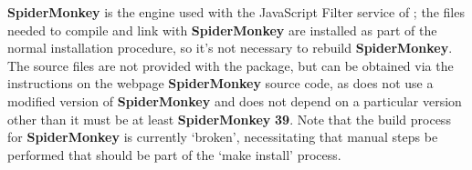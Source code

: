 \tertiaryEnd
\secondaryEnd
{}
\textbf{SpiderMonkey} is the  engine used with the JavaScript Filter
service of \mplusm{}; the files needed to compile and link with \textbf{SpiderMonkey} are
installed as part of the normal \mplusm{} installation procedure, so it's not necessary to
rebuild \textbf{SpiderMonkey}.
The source files are not provided with the  package, but can be obtained
via the instructions on the web\longDash{}page
%
{\textbf{SpiderMonkey} source code}, as \mplusm{} does not use a modified version of
\textbf{SpiderMonkey} and does not depend on a particular version \longDash{} other than
it must be at least \textbf{SpiderMonkey} \textbf{39}.
\newcommand{\spiderversion}{42a1}%
Note that the build process for \textbf{SpiderMonkey} is currently `broken', necessitating
that manual steps be performed that should be part of the `make install' process.
